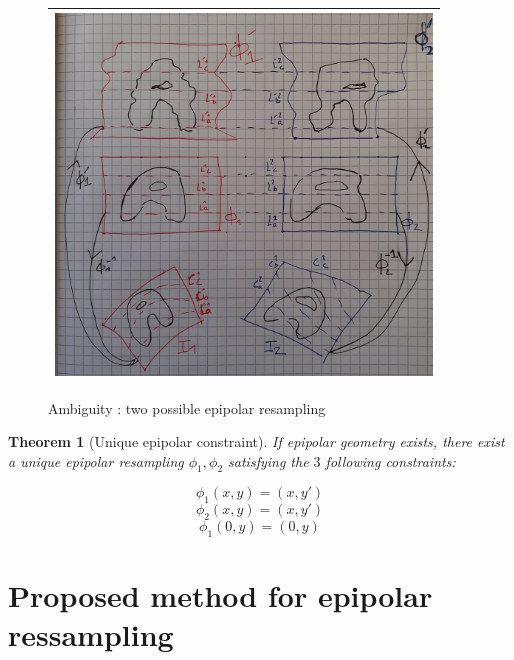\documentclass{ipol}
\newtheorem{theorem}{Theorem}
\begin{document}
\begin{figure}
\centering
\begin{tabular}{||c||}
 \hline \hline
\includegraphics[width=10cm]{FIGS/AmbigEpip.jpg}
 \\ \hline \hline
\end{tabular}
\caption{Ambiguity : two possible epipolar resampling}
\label{FigAmbigEpip}
\end{figure}




\begin{theorem}[Unique epipolar constraint]

If epipolar geometry exists, there exist a unique epipolar resampling $\phi_1,\phi_2$ satisfying the $3$ following constraints:

\begin{equation}
    \phi_1(x,y) = (x,y') \label{Ambig:PhiO}
\end{equation}
\begin{equation}
    \phi_2(x,y) = (x,y') \label{Ambig:PhiT}
\end{equation}
\begin{equation}
    \phi_1(0,y) = (0,y) \label{Ambig:Line}
\end{equation}
\label{Theo:Fix:Ambig}

\end{theorem}




\section{Proposed method for epipolar ressampling}
\end{document}
